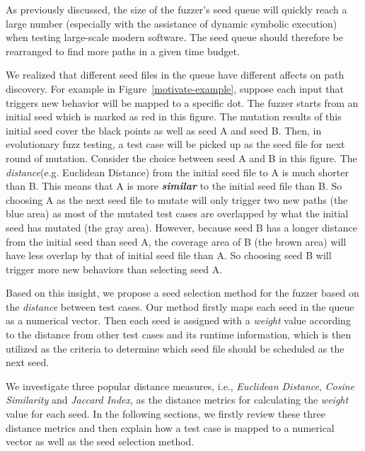 As previously discussed, the size of the fuzzer's seed queue will quickly reach a large number (especially with the assistance of dynamic symbolic execution) when testing large-scale modern software. The seed queue should therefore be rearranged to find more paths in a given time budget.

We realized that different seed files in the queue have different affects on path discovery. For example in Figure~\ref{motivate-example}, suppose each input that triggers new behavior will be mapped to a specific dot. The fuzzer starts from an initial seed which is marked as red in this figure. The mutation results of this initial seed cover the black points as well as seed A and seed B. Then, in evolutionary fuzz testing, a test case will be picked up as the seed file for next round of mutation. 
Consider the choice between seed A and B in this figure.
 The \emph{distance}(e.g. Euclidean Distance) from the initial seed file to A is much shorter than B. 
  This means that A is more \textbf{\textit{similar}} to the initial seed file than B. So choosing A as the next seed file to mutate will only trigger two new paths (the blue area) as most of the mutated test cases are overlapped by what the initial seed has mutated (the gray area). However, because seed B has a longer distance from the initial seed than seed A, the coverage area of B (the brown area) will have less overlap by that of initial seed file than A. So choosing seed B will trigger more new behaviors than selecting seed A.

Based on this insight, we propose a seed selection method for the fuzzer based on the \textit{distance} between test cases.
Our method firstly maps each seed in the queue as a numerical vector. 
 Then each seed is assigned with a \emph{weight} value according to the distance from other test cases and its runtime information, which is then utilized as the criteria to determine which seed file should be scheduled as the next seed.
 
We investigate three popular distance measures, i.e., \textit{Euclidean Distance}, \textit{Cosine Similarity} and \textit{Jaccard Index}, as the distance metrics for calculating the \textit{weight} value for each seed. 
 In the following sections, we firstly review these three distance metrics and then explain how a test case is mapped to a numerical vector as well as the seed selection method.

